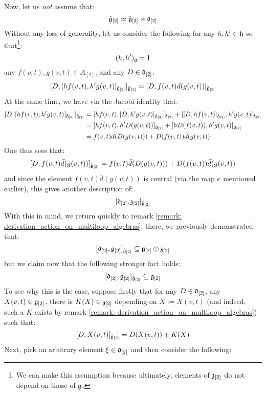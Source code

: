 \begin{remark}
            Now, let us \textit{not} assume that:
                $$\hat{\mathfrak{g}}_{[2]} \simeq \tilde{\mathfrak{g}}_{[2]}\rtimes \mathfrak{d}_{[2]}$$
            Without any loss of generality, let us consider the following for any $h, h' \in \mathfrak{h}$ so that\footnote{We can make this assumption because ultimately, elements of $\mathfrak{z}_{[2]}$ do not depend on those of $\mathfrak{g}$.}:
                $$(h, h')_{\mathfrak{g}} = 1$$
            any $f(v, t), g(v, t) \in A_{[2]}$, and any $D \in \mathfrak{d}_{[2]}$:
                $$[ D, [h f(v, t), h' g(v, t)]_{\tilde{\mathfrak{g}}_{[2]}} ]_{\hat{\mathfrak{g}}_{[2]}} = [ D, f(v, t) \bar{d}( g(v, t) ) ]_{\hat{\mathfrak{g}}_{[2]}}$$
            At the same time, we have via the Jacobi identity that:
                $$
                    \begin{aligned}
                        [ D, [h f(v, t), h' g(v, t)]_{\tilde{\g}_{[2]}} ]_{\hat{\g}_{[2]}} & = [ h f(v, t), [D, h' g(v, t)]_{\hat{\g}_{[2]}} ]_{\tilde{\g}_{[2]}} + [ [D, h f(v, t)]_{\hat{\g}_{[2]}}, h' g(v, t) ]_{\tilde{\g}_{[2]}}
                        \\
                        & = [ h f(v, t), h' D( g(v, t) ) ]_{\tilde{\g}_{[2]}} + [ h D( f(v, t) ), h' g(v, t) ]_{\tilde{\g}_{[2]}}
                        \\
                        & = f(v, t) \bar{d}( D( g(v, t) ) ) + D( f(v, t) ) \bar{d}(g(v, t))
                    \end{aligned}
                $$
            One thus sees that:
                $$[ D, f(v, t) \bar{d}( g(v, t) ) ]_{\hat{\mathfrak{g}}_{[2]}} = f(v, t) \bar{d}( D( g(v, t) ) ) + D( f(v, t) ) \bar{d}(g(v, t))$$
            and since the element $f(v, t) \bar{d}( g(v, t) )$ is central (via the map $\epsilon$ mentioned earlier), this gives another description of:
                $$[ \mathfrak{d}_{[2]}, \mathfrak{z}_{[2]} ]_{\hat{\mathfrak{g}}_{[2]}}$$
            With this in mind, we return quickly to remark \ref{remark: derivation_action_on_multiloop_algebras}; there, we previously demonstrated that:
                $$[ \mathfrak{d}_{[2]}, \mathfrak{g}_{[2]} ]_{\hat{\mathfrak{g}}_{[2]}} \subseteq \mathfrak{g}_{[2]} \oplus \mathfrak{z}_{[2]}$$
            but we claim now that the following stronger fact holds:
                $$[ \mathfrak{d}_{[2]}, \mathfrak{g}_{[2]} ]_{\hat{\mathfrak{g}}_{[2]}} \subseteq \mathfrak{g}_{[2]}$$
            To see why this is the case, suppose firstly that for any $D \in \mathfrak{d}_{[2]}$, any $X(v, t) \in \mathfrak{g}_{[2]}$, there is $K(X) \in \mathfrak{z}_{[2]}$ depending on $X := X(v, t)$ (and indeed, such a $K$ exists by remark \ref{remark: derivation_action_on_multiloop_algebras}) such that:
                $$[ D, X(v, t) ]_{\hat{\mathfrak{g}}_{[2]}} = D( X(v, t) ) + K(X)$$
            Next, pick an arbitrary element $\xi \in \mathfrak{d}_{[2]}$ and then consider the following:

\end{remark}

